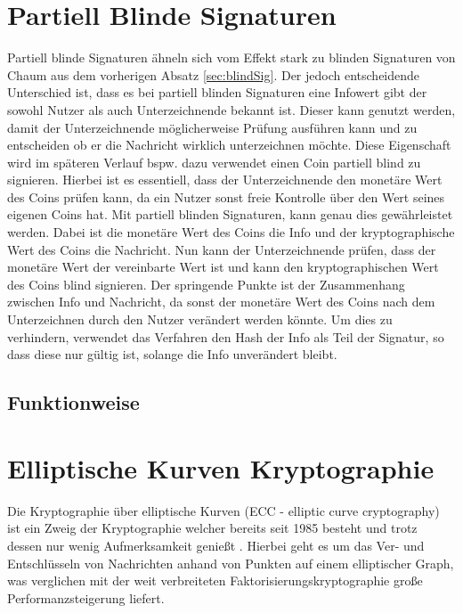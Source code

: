 \documentclass[11pt,a4paper]{scrreprt}
\begin{document}
\section{Partiell Blinde Signaturen}
\label{sec:partBlindSig}
Partiell blinde Signaturen ähneln sich vom Effekt stark zu blinden Signaturen von Chaum aus dem vorherigen Absatz \ref{sec:blindSig}. Der jedoch entscheidende Unterschied ist, dass es bei partiell blinden Signaturen eine Infowert gibt der sowohl Nutzer als auch Unterzeichnende bekannt ist. Dieser kann genutzt werden, damit der Unterzeichnende möglicherweise Prüfung ausführen kann und zu entscheiden ob er die Nachricht wirklich unterzeichnen möchte. Diese Eigenschaft wird im späteren Verlauf bspw. dazu verwendet einen Coin partiell blind zu signieren. Hierbei ist es essentiell, dass der Unterzeichnende den monetäre Wert des Coins prüfen kann, da ein Nutzer sonst freie Kontrolle über den Wert seines eigenen Coins hat. Mit partiell blinden Signaturen, kann genau dies gewährleistet werden. Dabei ist die monetäre Wert des Coins die Info und der kryptographische Wert des Coins die Nachricht. Nun kann der Unterzeichnende prüfen, dass der monetäre Wert der vereinbarte Wert ist und kann den kryptographischen Wert des Coins blind signieren. Der springende Punkte ist der Zusammenhang zwischen Info und Nachricht, da sonst der monetäre Wert des Coins nach dem Unterzeichnen durch den Nutzer verändert werden könnte. Um dies zu verhindern, verwendet das Verfahren den Hash der Info als Teil der Signatur, so dass diese nur gültig ist, solange die Info unverändert bleibt.

\subsection{Funktionweise}


\section{Elliptische Kurven Kryptographie}
Die Kryptographie über elliptische Kurven (ECC - elliptic curve cryptography) ist ein Zweig der Kryptographie welcher bereits seit 1985 besteht \cite{ecc-miller1985use} und trotz dessen nur wenig Aufmerksamkeit genießt . Hierbei geht es um das Ver- und Entschlüsseln von Nachrichten anhand von Punkten auf einem elliptischer Graph, was verglichen mit der weit verbreiteten Faktorisierungskryptographie große Performanzsteigerung liefert.
\end{document}
